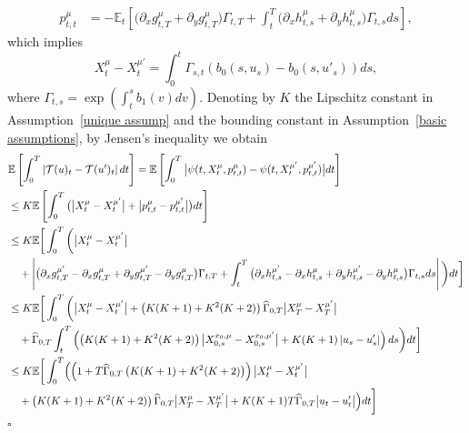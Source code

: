 \documentclass[12pt]{article}
\theoremstyle{named}
\numberwithin{equation}{section}
\newenvironment{Proof}{\removelastskip\par\medskip \noindent{\em Proof.} \rm}{\penalty-20\null\hfill$\square$\par\medbreak}
\begin{document}
\begin{Proof}
\begin{align*}
    p^{\mu}_{t,t} & = - \mathbb{E}_t \left[ \big(\partial_xg^{\mu}_{t,T} + \partial_yg^{\mu}_{t,T}\big) \Gamma_{t,T}
      + \int_t^T \big(\partial_xh^{\mu}_{t,s} + \partial_yh^{\mu}_{t,s}\big) \Gamma_{t,s} ds\right],
\end{align*}
which implies
\begin{equation*}
    X^\mu_t - X^{\mu'}_t  = \int_0^t \Gamma_{s,t}  \left( b_0(s,u_s) - b_0(s,u'_s) \right) ds,
\end{equation*}
where $\Gamma_{t,s} = \exp\left( \int_t^s b_1(v) dv \right)$.
Denoting by $K$
the Lipschitz constant in Assumption~\ref{unique assump}
and the bounding constant in Assumption~\ref{basic assumptions},
by Jensen's inequality we obtain
\begin{align}
&  \mathbb{E}\left[ \int_0^T \left\lvert \mathcal{T}(u)_t - \mathcal{T}(u')_t \right\rvert dt\right]
 =  \mathbb{E}\left[ \int_0^T \big| \psi(t, X^\mu_t, p^{\mu}_{t,t}) - \psi(t, X^{\mu'}_t, p^{\mu'}_{t,t})\big| dt\right] \nonumber\\
        &\leq K\mathbb{E}\left[ \int_0^T \big( \big| X^\mu_t - X^{\mu'}_t\big| + \big| p^{\mu}_{t,t} - p^{\mu'}_{t,t}\big| \big) dt\right] \nonumber\\
        &\leq K\mathbb{E}\bigg[ \int_0^T \bigg( \big| X^\mu_t - X^{\mu'}_t\big|
          \nonumber\\
          & \quad + \left| \big( \partial_xg^{\mu'}_{t,T} -\partial_xg^{\mu}_{t,T} + \partial_yg^{\mu'}_{t,T} - \partial_yg^{\mu}_{t,T}\big)
          \Gamma_{t,T}
          + \int_t^T \big( \partial_xh^{\mu'}_{t,s} -\partial_xh^{\mu}_{t,s} + \partial_yh^{\mu'}_{t,s} - \partial_yh^{\mu}_{t,s}\big)
          \Gamma_{t,s}
          ds\right| \bigg) dt\bigg]
        \nonumber\\
        &\leq K\mathbb{E}\bigg[ \int_0^T \bigg( \big| X^\mu_t - X^{\mu'}_t\big|
                + \left(K(K+1) + K^2(K+2)\right)\widehat{\Gamma}_{0,T} \big| X^\mu_T - X^{\mu'}_T\big|
          \nonumber\\
        & \quad + \widehat{\Gamma}_{0,T}\int_t^T \left( \left(K(K+1) + K^2(K+2)\right) \big| X^{x_0,\mu}_{0,s} - X^{x_0,\mu'}_{0,s}\big| + K(K+1) \left\lvert u_s - u'_s\right\rvert \right)  ds \bigg) dt\bigg] \label{eq:unique bound}\\
        &\leq K\mathbb{E}\bigg[ \int_0^T \Bigl( \left(1 + T\widehat{\Gamma}_{0,T}\left(K(K+1) + K^2(K+2)\right)\right) \big| X^\mu_t - X^{\mu'}_t\big| \nonumber\\
        & \quad + \left(K(K+1) + K^2(K+2)\right)\widehat{\Gamma}_{0,T}\big| X^\mu_T - X^{\mu'}_T\big| + K(K+1) T\widehat{\Gamma}_{0,T} \big| u_t - u'_t\big|\Bigr) dt \bigg] \nonumber\\

\end{align}
\end{Proof}
\end{document}
